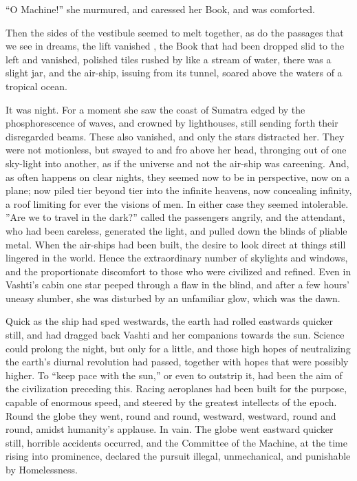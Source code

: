 ``O Machine!'' she murmured, and caressed her Book, and was comforted.

Then the sides of the vestibule seemed to melt together, as do the passages that we see in dreams, the lift vanished , the Book that had been dropped slid to the left and vanished, polished tiles rushed by like a stream of water, there was a slight jar, and the air-ship, issuing from its tunnel, soared above the waters of a tropical ocean.

It was night. For a moment she saw the coast of Sumatra edged by the phosphorescence of waves, and crowned by lighthouses, still sending forth their disregarded beams. These also vanished, and only the stars distracted her. They were not motionless, but swayed to and fro above her head, thronging out of one sky-light into another, as if the universe and not the air-ship was careening. And, as often happens on clear nights, they seemed now to be in perspective, now on a plane; now piled tier beyond tier into the infinite heavens, now concealing infinity, a roof limiting for ever the visions of men. In either case they seemed intolerable. ''Are we to travel in the dark?'' called the passengers angrily, and the attendant, who had been careless, generated the light, and pulled down the blinds of pliable metal. When the air-ships had been built, the desire to look direct at things still lingered in the world. Hence the extraordinary number of skylights and windows, and the proportionate discomfort to those who were civilized and refined. Even in Vashti's cabin one star peeped through a flaw in the blind, and after a few hours' uneasy slumber, she was disturbed by an unfamiliar glow, which was the dawn.

Quick as the ship had sped westwards, the earth had rolled eastwards quicker still, and had dragged back Vashti and her companions towards the sun. Science could prolong the night, but only for a little, and those high hopes of neutralizing the earth's diurnal revolution had passed, together with hopes that were possibly higher. To ``keep pace with the sun,'' or even to outstrip it, had been the aim of the civilization preceding this. Racing aeroplanes had been built for the purpose, capable of enormous speed, and steered by the greatest intellects of the epoch. Round the globe they went, round and round, westward, westward, round and round, amidst humanity's applause. In vain. The globe went eastward quicker still, horrible accidents occurred, and the Committee of the Machine, at the time rising into prominence, declared the pursuit illegal, unmechanical, and punishable by Homelessness.

